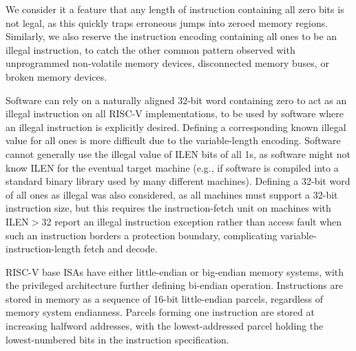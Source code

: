 \begin{commentary}
We consider it a feature that any length of instruction containing all
zero bits is not legal, as this quickly traps erroneous jumps into
zeroed memory regions. Similarly, we also reserve the instruction
encoding containing all ones to be an illegal instruction, to catch
the other common pattern observed with unprogrammed non-volatile
memory devices, disconnected memory buses, or broken memory devices.

Software can rely on a naturally aligned 32-bit word containing zero
to act as an illegal instruction on all RISC-V implementations, to be
used by software where an illegal instruction is explicitly desired.
Defining a corresponding known illegal value for all ones is more
difficult due to the variable-length encoding.  Software cannot
generally use the illegal value of ILEN bits of all 1s, as software
might not know ILEN for the eventual target machine (e.g., if software
is compiled into a standard binary library used by many different
machines).  Defining a 32-bit word of all ones as illegal was also
considered, as all machines must support a 32-bit instruction size,
but this requires the instruction-fetch unit on machines with
ILEN$>$32 report an illegal instruction exception rather than access
fault when such an instruction borders a protection boundary,
complicating variable-instruction-length fetch and decode.
\end{commentary}

RISC-V base ISAs have either little-endian or big-endian memory systems,
with the privileged architecture further defining bi-endian operation.
Instructions are stored in memory as a sequence of 16-bit little-endian
parcels, regardless of memory system endianness.
Parcels forming one instruction are stored at increasing
halfword addresses, with the lowest-addressed parcel holding the
lowest-numbered bits in the instruction specification.

